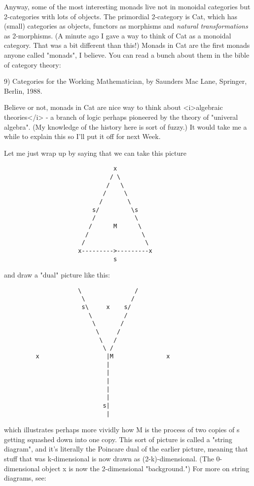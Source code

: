 Anyway, some of the most interesting monads live not in monoidal
categories but 2-categories with lots of objects.  The primordial
2-category is Cat, which has (small) categories as objects, functors as
morphisms and \emph{natural transformations} as 2-morphisms.  (A minute ago I
gave a way to think of Cat as a monoidal category.  That was a bit
different than this!)  Monads in Cat are the first monads anyone called
"monads", I believe.  You can read a bunch about them in the bible of
category theory:

9) Categories for the Working Mathematician, by Saunders Mac Lane,
Springer, Berlin, 1988.

Believe or not, monads in Cat are nice way to think about <i>algebraic
theories</i> - a branch of logic perhaps pioneered by the theory of
"univeral algebra". (My knowledge of the history here is sort of fuzzy.) 
It would take me a while to explain this so I'll put it off for next
Week.  

Let me just wrap up by saying that we can take this picture 

\begin{verbatim}
                               x
                              / \
                             /   \
                            /     \
                           /       \
                         s/         \s
                         /           \
                        /      M      \
                       /               \
                      /                 \
                     x--------->---------x
                               s

\end{verbatim}
    
and draw a "dual" picture like this:

\begin{verbatim}
                     \               /
                      \             /
                      s\     x    s/
                        \         /
                         \       /
                          \     /
                           \   /
                            \ /
         x                   |M               x
                             |
                             |
                             |
                             |
                             |
                            s|
                             |

\end{verbatim}
    
which illustrates perhaps more vividly how M is the process of two 
copies of s getting squashed down into one copy.  This sort of picture
is called a "string diagram", and it's literally the Poincare dual of
the earlier picture, meaning that stuff that was k-dimensional is now
drawn as (2-k)-dimensional.   (The 0-dimensional object x is now the
2-dimensional "background.")  For more on string diagrams, see:

